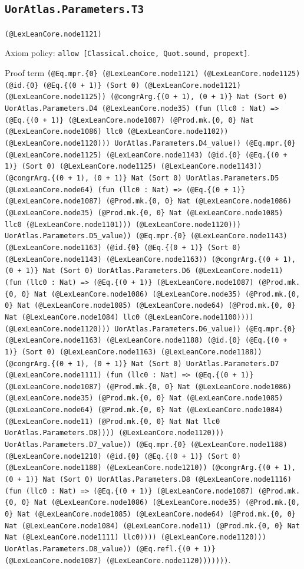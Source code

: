 \documentclass[11pt]{article}
\begin{document}
\subsection*{\texttt{UorAtlas.Parameters.T3}}
\noindent\texttt{(@LexLeanCore.node1121)}\par
\noindent Axiom policy: \texttt{allow [Classical.choice, Quot.sound, propext]}.\par
\noindent Proof term \texttt{(@Eq.mpr.\{0\} (@LexLeanCore.node1121) (@LexLeanCore.node1125) (@id.\{0\} (@Eq.\{(0 + 1)\} (Sort 0) (@LexLeanCore.node1121) (@LexLeanCore.node1125)) (@congrArg.\{(0 + 1), (0 + 1)\} Nat (Sort 0) UorAtlas.Parameters.D4 (@LexLeanCore.node35) (fun (llc0 : Nat) => (@Eq.\{(0 + 1)\} (@LexLeanCore.node1087) (@Prod.mk.\{0, 0\} Nat (@LexLeanCore.node1086) llc0 (@LexLeanCore.node1102)) (@LexLeanCore.node1120))) UorAtlas.Parameters.D4\_value)) (@Eq.mpr.\{0\} (@LexLeanCore.node1125) (@LexLeanCore.node1143) (@id.\{0\} (@Eq.\{(0 + 1)\} (Sort 0) (@LexLeanCore.node1125) (@LexLeanCore.node1143)) (@congrArg.\{(0 + 1), (0 + 1)\} Nat (Sort 0) UorAtlas.Parameters.D5 (@LexLeanCore.node64) (fun (llc0 : Nat) => (@Eq.\{(0 + 1)\} (@LexLeanCore.node1087) (@Prod.mk.\{0, 0\} Nat (@LexLeanCore.node1086) (@LexLeanCore.node35) (@Prod.mk.\{0, 0\} Nat (@LexLeanCore.node1085) llc0 (@LexLeanCore.node1101))) (@LexLeanCore.node1120))) UorAtlas.Parameters.D5\_value)) (@Eq.mpr.\{0\} (@LexLeanCore.node1143) (@LexLeanCore.node1163) (@id.\{0\} (@Eq.\{(0 + 1)\} (Sort 0) (@LexLeanCore.node1143) (@LexLeanCore.node1163)) (@congrArg.\{(0 + 1), (0 + 1)\} Nat (Sort 0) UorAtlas.Parameters.D6 (@LexLeanCore.node11) (fun (llc0 : Nat) => (@Eq.\{(0 + 1)\} (@LexLeanCore.node1087) (@Prod.mk.\{0, 0\} Nat (@LexLeanCore.node1086) (@LexLeanCore.node35) (@Prod.mk.\{0, 0\} Nat (@LexLeanCore.node1085) (@LexLeanCore.node64) (@Prod.mk.\{0, 0\} Nat (@LexLeanCore.node1084) llc0 (@LexLeanCore.node1100)))) (@LexLeanCore.node1120))) UorAtlas.Parameters.D6\_value)) (@Eq.mpr.\{0\} (@LexLeanCore.node1163) (@LexLeanCore.node1188) (@id.\{0\} (@Eq.\{(0 + 1)\} (Sort 0) (@LexLeanCore.node1163) (@LexLeanCore.node1188)) (@congrArg.\{(0 + 1), (0 + 1)\} Nat (Sort 0) UorAtlas.Parameters.D7 (@LexLeanCore.node1111) (fun (llc0 : Nat) => (@Eq.\{(0 + 1)\} (@LexLeanCore.node1087) (@Prod.mk.\{0, 0\} Nat (@LexLeanCore.node1086) (@LexLeanCore.node35) (@Prod.mk.\{0, 0\} Nat (@LexLeanCore.node1085) (@LexLeanCore.node64) (@Prod.mk.\{0, 0\} Nat (@LexLeanCore.node1084) (@LexLeanCore.node11) (@Prod.mk.\{0, 0\} Nat Nat llc0 UorAtlas.Parameters.D8)))) (@LexLeanCore.node1120))) UorAtlas.Parameters.D7\_value)) (@Eq.mpr.\{0\} (@LexLeanCore.node1188) (@LexLeanCore.node1210) (@id.\{0\} (@Eq.\{(0 + 1)\} (Sort 0) (@LexLeanCore.node1188) (@LexLeanCore.node1210)) (@congrArg.\{(0 + 1), (0 + 1)\} Nat (Sort 0) UorAtlas.Parameters.D8 (@LexLeanCore.node1116) (fun (llc0 : Nat) => (@Eq.\{(0 + 1)\} (@LexLeanCore.node1087) (@Prod.mk.\{0, 0\} Nat (@LexLeanCore.node1086) (@LexLeanCore.node35) (@Prod.mk.\{0, 0\} Nat (@LexLeanCore.node1085) (@LexLeanCore.node64) (@Prod.mk.\{0, 0\} Nat (@LexLeanCore.node1084) (@LexLeanCore.node11) (@Prod.mk.\{0, 0\} Nat Nat (@LexLeanCore.node1111) llc0)))) (@LexLeanCore.node1120))) UorAtlas.Parameters.D8\_value)) (@Eq.refl.\{(0 + 1)\} (@LexLeanCore.node1087) (@LexLeanCore.node1120)))))))}.\par
\end{document}
